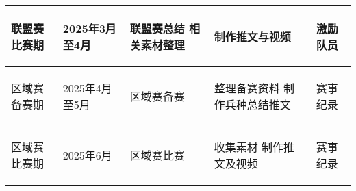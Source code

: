 \begin{longtable}{ X | X | X | X | X }
    \hline

        \begin{center}
            联盟赛比赛期
        \end{center}&
        \begin{center}
            2025年3月至4月
        \end{center}&
        \begin{center}
            联盟赛总结
            \newline 相关素材整理
        \end{center}&
        \begin{center}
            制作推文与视频
        \end{center}&
        \begin{center}
            激励队员
        \end{center}\\
    
    \hline

        \begin{center}
            区域赛备赛期
        \end{center}&
        \begin{center}
            2025年4月至5月
        \end{center}&
        \begin{center}
            区域赛备赛
        \end{center}&
        \begin{center}
            整理备赛资料
            \newline 制作兵种总结推文
        \end{center}&
        \begin{center}
            赛事纪录
        \end{center}\\
    
    \hline

        \begin{center}
            区域赛比赛期
        \end{center}&
        \begin{center}
            2025年6月
        \end{center}&
        \begin{center}
            区域赛比赛
        \end{center}&
        \begin{center}
            收集素材
            \newline 制作推文及视频
        \end{center}&
        \begin{center}
            赛事纪录
        \end{center}\\
    

\end{longtable}
